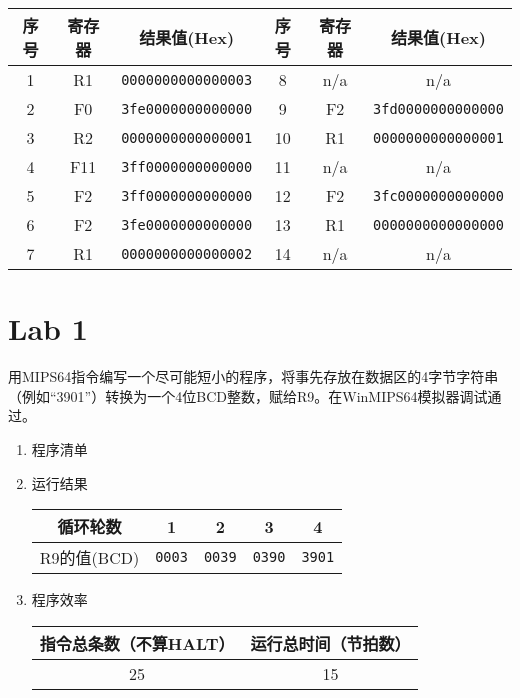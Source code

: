 \begin{solve}
  \begin{center}
  \begin{tabular}{cccccc}
    \toprule
    序号 & 寄存器 & 结果值(Hex) & 序号 & 寄存器 & 结果值(Hex)\\\midrule
    1 & R1 & \texttt{0000000000000003} & 8 & n/a & n/a \\
    2 & F0 & \texttt{3fe0000000000000} & 9 & F2 & \texttt{3fd0000000000000}\\
    3 & R2 & \texttt{0000000000000001} & 10 & \textrm{R1} & \texttt{0000000000000001}\\
    4 & F11 & \texttt{3ff0000000000000} & 11 & n/a & n/a \\
    5 & F2 & \texttt{3ff0000000000000} & 12 & F2 & \texttt{3fc0000000000000}\\
    6 & F2 & \texttt{3fe0000000000000} & 13 & R1 & \texttt{0000000000000000}\\
    7 & R1 & \texttt{0000000000000002} & 14 & n/a & n/a \\
    \bottomrule
  \end{tabular}
  \end{center}
\end{solve}

\section{Lab 1}

用MIPS64指令编写一个尽可能短小的程序，将事先存放在数据区的4字节字符串
（例如``3901''）转换为一个4位BCD整数，赋给R9。在WinMIPS64模拟器调试通
过。

\begin{solve}
  \begin{enumerate}
  \item 程序清单
    
  \item 运行结果
    
    \begin{center}
      \begin{tabular}{ccccc}
        \toprule
        循环轮数 & 1 & 2 & 3 & 4\\\midrule
        R9的值(BCD) & \texttt{0003} & \texttt{0039} & \texttt{0390} & \texttt{3901}\\\bottomrule
      \end{tabular}
    \end{center}
  \item 程序效率

    \begin{center}
      \begin{tabular}{cc}
        \toprule
        指令总条数（不算HALT） & 运行总时间（节拍数） \\\midrule
        25 & 15\\\bottomrule
      \end{tabular}
    \end{center}

  \end{enumerate}
  
\end{solve}



